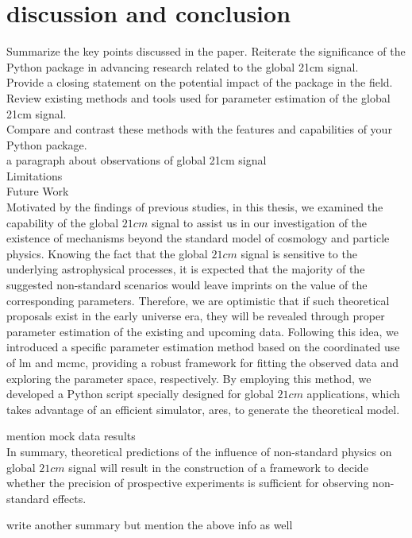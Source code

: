 \documentclass[%
 reprint,
 amsmath,amssymb,
 aps,
]{revtex4-2}
\begin{document}
\section{discussion and conclusion}
\label{sec:discussion}
Summarize the key points discussed in the paper.
Reiterate the significance of the Python package in advancing research related to the global 21cm signal.\\
Provide a closing statement on the potential impact of the package in the field.\\
Review existing methods and tools used for parameter estimation of the global 21cm signal.\\
Compare and contrast these methods with the features and capabilities of your Python package.\\
a paragraph about observations of global 21cm signal\\
Limitations\\
Future Work\\
Motivated by the findings of previous studies, in this thesis, we examined the capability of the global $21cm$ signal to assist us in our investigation of the existence of mechanisms beyond the standard model of cosmology and particle physics. Knowing the fact that the global $21cm$ signal is sensitive to the underlying astrophysical processes, it is expected that the majority of the suggested non-standard scenarios would leave imprints on the value of the corresponding parameters. Therefore, we are optimistic that if such theoretical proposals exist in the early universe era, they will be revealed through proper parameter estimation of the existing and upcoming data. Following this idea, we introduced a specific parameter estimation method based on the coordinated use of \gls{lm} and \gls{mcmc}, providing a robust framework for fitting the observed data and exploring the parameter space, respectively. By employing this method, we developed a Python script specially designed for global $21cm$ applications, which takes advantage of an efficient simulator, \gls{ares}, to generate the theoretical model.\par
mention mock data results\\
In summary, theoretical predictions of the influence of non-standard physics on global $21cm$ signal will result in the construction of a framework to decide whether the precision of prospective experiments is sufficient for observing non-standard effects.\par
write another summary but mention the above info as well\\
\end{document}
